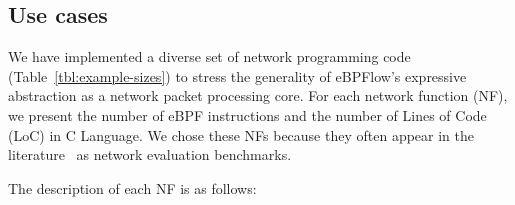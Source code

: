 
\subsection{Use cases}
\label{sec:use-cases}

We have implemented a diverse set of network programming code (Table~\ref{tbl:example-sizes}) to stress the generality of eBPFlow's expressive abstraction as a network packet processing core.
For each network function (NF), we present the number of eBPF instructions and the number of Lines of Code (LoC) in C Language. 
We chose these NFs because they often appear in the literature~\cite{Panda:2016,Sun:2017:NEN:3098822.3098826} as network evaluation benchmarks.

The description of each NF is as follows:

\begin{table}[t]
\centering
\caption{eBPF programs used during experiments.}
\label{tbl:example-sizes}
\end{table}

